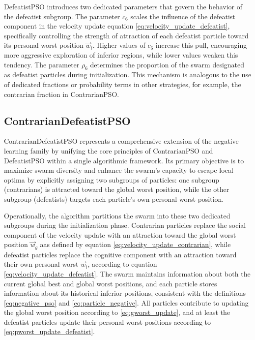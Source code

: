 {DefeatistPSO introduces two dedicated parameters that govern the behavior of the defeatist subgroup. The parameter  $c_6$ scales the influence of the defeatist component in the velocity update equation \eqref{eq:velocity_update_defeatist}, specifically controlling the strength of attraction of each defeatist particle toward its personal worst position $\vec{w}_i$. Higher values of $c_6$ increase this pull, encouraging more aggressive exploration of inferior regions, while lower values weaken this tendency.
The parameter $\rho_6$ determines the proportion of the swarm designated as defeatist particles during initialization. This mechanism is analogous to the use of dedicated fractions or probability terms in other strategies, for example, the contrarian fraction in ContrarianPSO.


\subsection*{ContrarianDefeatistPSO}

ContrarianDefeatistPSO represents a comprehensive extension of the negative learning family by unifying the core principles of ContrarianPSO and DefeatistPSO within a single algorithmic framework. Its primary objective is to maximize swarm diversity and enhance the swarm’s capacity to escape local optima by explicitly assigning two subgroups of particles: one subgroup (contrarians) is attracted toward the global worst position, while the other subgroup (defeatists) targets each particle’s own personal worst position.

Operationally, the algorithm partitions the swarm into these two dedicated subgroups during the initialization phase. Contrarian particles replace the social component of the velocity update with an attraction toward the global worst position $\vec{w}_g$ aas defined by equation \eqref{eq:velocity_update_contrarian}, while defeatist particles replace the cognitive component with an attraction toward their own personal worst $\vec{w}_i$, according to equation \eqref{eq:velocity_update_defeatist}.
The swarm maintains information about both the current global best and global worst positions, and each particle stores information about its historical inferior positions, consistent with the definitions \eqref{eq:negative_pso} and \eqref{eq:particle_negative}. All particles contribute to updating the global worst position according to \eqref{eq:gworst_update}, and at least the defeatist particles update their personal worst positions according to \eqref{eq:pworst_update_defeatist}.

}
